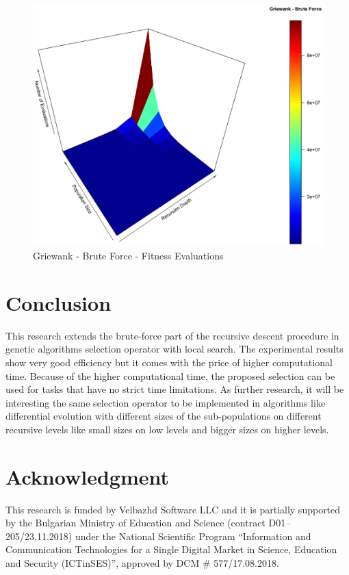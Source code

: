 \documentclass[conference]{IEEEtran}
\begin{document}
\begin{figure}[tbp]
\centering
\includegraphics[width=1.0\hsize,height=0.65\hsize]{fig31.eps}
\caption{Griewank - Brute Force - Fitness Evaluations}
\label{fig30}
\end{figure}

\section{Conclusion}

This research extends the brute-force part of the recursive descent procedure in genetic algorithms selection operator with local search. The experimental results show very good efficiency but it comes with the price of higher computational time. Because of the higher computational time, the proposed selection can be used for tasks that have no strict time limitations. As further research, it will be interesting the same selection operator to be implemented in algorithms like differential evolution \cite{reddy-01} with different sizes of the sub-populations \cite{koumousis-01} on different recursive levels like small sizes on low levels and bigger sizes on higher levels. 

\section*{Acknowledgment}

This research is funded by Velbazhd Software LLC and it is partially supported by the Bulgarian Ministry of Education and Science (contract D01–205/23.11.2018) under the National Scientific Program ``Information and Communication Technologies for a Single Digital Market in Science, Education and Security (ICTinSES)'', approved by DCM \# 577/17.08.2018.
\end{document}

